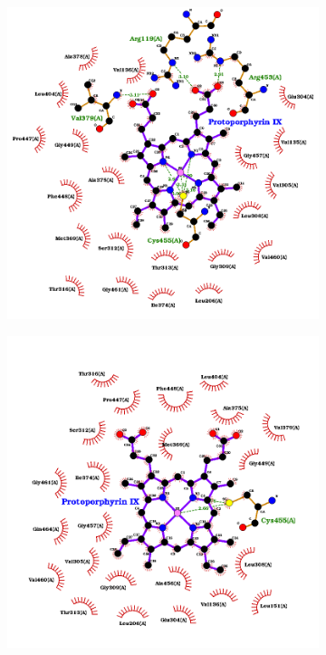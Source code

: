 \documentclass[12pt]{article}
\begin{document}
	\FloatBarrier
	\begin{figure}[h!]
		\centering
		\begin{subfigure}[h!]{0.35\textwidth}
			\hspace{2cm}
			\includegraphics[width=\textwidth]{../5/known/Dock/best.png}
			\caption{}
		\end{subfigure}
		\hfill
		\begin{subfigure}[h!]{0.35\textwidth}
			\hspace{-2cm}
			\includegraphics[width=\textwidth]{../5/known/Dock/best2.png}

\end{subfigure}
\end{figure}
\end{document}
